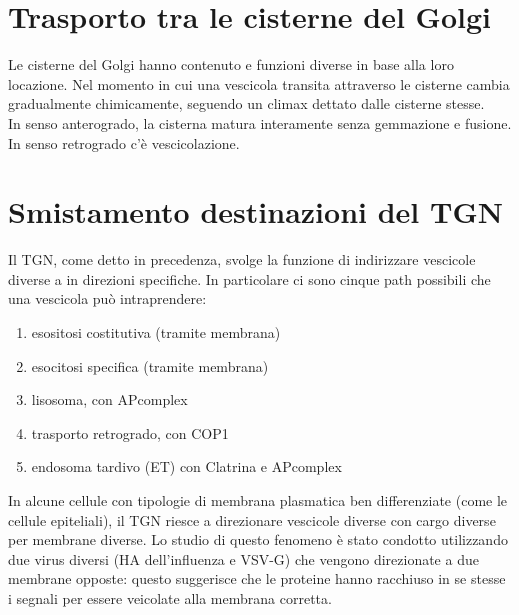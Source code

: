 \section{Trasporto tra le cisterne del Golgi}
    Le cisterne del Golgi hanno contenuto e funzioni diverse in base alla loro locazione. Nel momento in cui una vescicola transita attraverso le cisterne cambia gradualmente chimicamente, seguendo un climax dettato dalle cisterne stesse.\\
    In senso anterogrado, la cisterna matura interamente senza gemmazione e fusione.\\
    In senso retrogrado c'è vescicolazione.

\section{Smistamento destinazioni del TGN}
    Il TGN, come detto in precedenza, svolge la funzione di indirizzare vescicole diverse a in direzioni specifiche. In particolare ci sono cinque path possibili che una vescicola può intraprendere:
    \begin{enumerate}
        \item esositosi costitutiva (tramite membrana)
        \item esocitosi specifica (tramite membrana)
        \item lisosoma, con APcomplex
        \item trasporto retrogrado, con COP1
        \item endosoma tardivo (ET) con Clatrina e APcomplex
    \end{enumerate}
    In alcune cellule con tipologie di membrana plasmatica ben differenziate (come le cellule epiteliali), il TGN riesce a direzionare vescicole diverse con cargo diverse per membrane diverse. 
    Lo studio di questo fenomeno è stato condotto utilizzando due virus diversi (HA dell'influenza e VSV-G) che vengono direzionate a due membrane opposte: questo suggerisce che le proteine hanno racchiuso in se stesse i segnali per essere veicolate alla membrana corretta.
    

